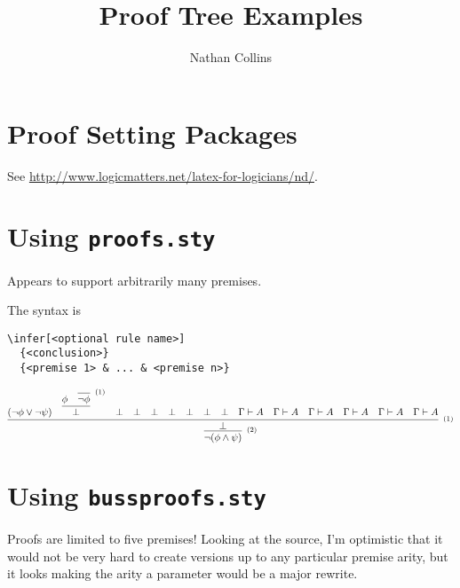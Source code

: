 \documentclass{article}
\begin{document}
\title{Proof Tree Examples}
\author{Nathan Collins}

\maketitle
\section{Proof Setting Packages}
See \url{http://www.logicmatters.net/latex-for-logicians/nd/}.

\section{Using \texttt{proofs.sty}}
Appears to support arbitrarily many premises.

The syntax is
\begin{verbatim}
\infer[<optional rule name>]
  {<conclusion>}
  {<premise 1> & ... & <premise n>}
\end{verbatim}
\[
\infer[^{(2)}]
     {\neg(\phi \land \psi)}
     {\infer[^{(1)}]
        {\bot}
        {(\neg\phi \lor \neg\psi) &
        \infer
            {\bot}
            {\phi &
            \infer[^{(1)}]
            {\neg\phi}{}
            }
        & \bot & \bot & \bot & \bot & \bot & \bot & \bot
        & \Gamma \vdash A & \Gamma \vdash A & \Gamma \vdash A & \Gamma \vdash A & \Gamma \vdash A & \Gamma \vdash A
        }
     }
\]
\section{Using \texttt{bussproofs.sty}}
Proofs are limited to five premises!  Looking at the source, I'm
optimistic that it would not be very hard to create versions up to any
particular premise arity, but it looks making the arity a parameter
would be a major rewrite.

\begin{prooftree}
\end{prooftree}

\begin{prooftree}
\end{prooftree}
\end{document}
